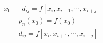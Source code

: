 \documentclass[11pt,a4paper]{jsarticle}
\begin{document}
\begin{eqnarray*}
x_0
  && d_{ij} = f[x_i,x_{i+1},\cdots,x_{i+j}]
\end{eqnarray*}
\begin{eqnarray*}
  && p_n(x_0) = f(x_0) \\
  && d_{ij} = f[x_i,x_{i+1},\cdots,x_{i+j}]
\end{eqnarray*}
\end{document}
